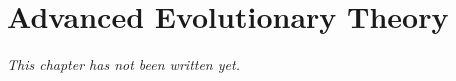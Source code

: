 \chapter{Advanced Evolutionary Theory}\label{ch:b3:adv-evo}


\emph{This chapter has not been written yet.}

